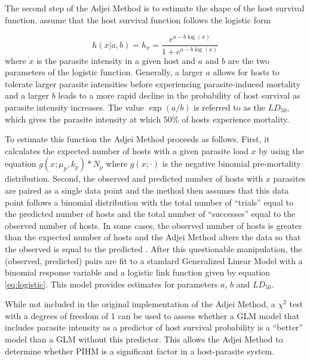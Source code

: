 \documentclass[12pt, a4paper]{article}
\begin{document}
The second step of the Adjei Method is to estimate the shape of the host survival function. \cite{Adjei1986} assume that the host survival function follows the logistic form

\begin{equation}
    h(x | a, b) = h_x = \dfrac{e^{a - b \log(x)}}{1 + e^{a - b \log(x)}}
    \label{eq:logistic}
\end{equation}
where $x$ is the parasite intensity in a given host and $a$ and $b$ are the two
parameters of the logistic function. Generally, a larger $a$ allows for hosts to
tolerate larger parasite intensities before experiencing parasite-induced mortality
and a larger $b$ leads to a more rapid decline in the probability of host
survival as parasite intensity increases.  The value $\exp(a / b)$ is referred
to as the $LD_{50}$, which gives the parasite intensity at which 50\% of hosts
experience mortality.

To estimate this function the Adjei Method proceeds as follows.  First, it
calculates the expected number of hosts with a given parasite load $x$ by using
the equation $g(x ; \mu_p, k_p) * N_p$ where $g(x ; \cdot)$ is the negative binomial pre-mortality distribution.  Second, the observed and predicted number of hosts
with $x$ parasites are paired as a single data point and the method then assumes that
this data point follows a binomial distribution with the total number of
``trials'' equal to the predicted number of hosts and the total number of
``successes'' equal to the observed number of hosts. In some cases, the
observed number of hosts is greater than the expected number of hosts and the
Adjei Method alters the data so that the observed is equal to the predicted
\citep{Adjei1986}.  After this questionable manipulation, the (observed, predicted) pairs are fit to a standard Generalized Linear Model \citep{McCullagh1989} with a binomial response variable and a logistic link function given by equation \ref{eq:logistic}.  This model provides estimates for parameters $a$, $b$ and $LD_{50}$.

While not included in the original implementation of the Adjei Method, a
$\chi^2$ test with a degrees of freedom of 1 can be used to assess whether a GLM model that includes parasite
intensity as a predictor of host survival probability is a ``better'' model than a
GLM without this predictor.  This allows the Adjei Method to determine whether
PIHM is a significant factor in a host-parasite system.
\end{document}
